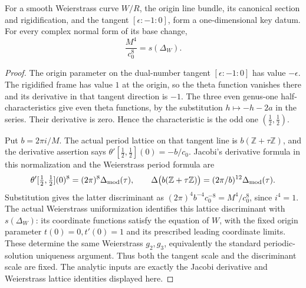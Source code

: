 \begin{srlemma}
\label{lem:ftb-key-elliptic-discriminant}
For a smooth Weierstrass curve \(W/R\), the origin line bundle,
its canonical section and rigidification, and the tangent
\([\epsilon:-1:0]\), form a one-dimensional key datum.
For every complex normal form of its base change,
\[
                         \frac{M^4}{c_0^8}=s(\Delta_W).
 \tag{A1}\label{eq:ftb-key-elliptic}
\]
\end{srlemma}
\begin{proof}
The origin parameter on the dual-number tangent
\([\epsilon:-1:0]\) has value \(-\epsilon\).
The rigidified frame has value \(1\) at the origin, so the theta
function vanishes there and its derivative in that tangent
direction is \(-1\).
The three even genus-one half-characteristics give even theta
functions, by the substitution \(h\mapsto-h-2a\) in the series.
Their derivative is zero.  Hence the characteristic is the odd
one \((\tfrac12,\tfrac12)\).

Put \(b=2\pi i/M\).  The actual period lattice on that tangent line
is \(b(\mathbb Z+\tau\mathbb Z)\), and the derivative assertion says
\(\theta'[\tfrac12,\tfrac12](0)=-b/c_0\).
Jacobi's derivative formula in this normalization and the
Weierstrass period formula are
\[
 \theta'[\tfrac12,\tfrac12](0)^8=(2\pi)^8\Delta_{\rm mod}(\tau),
 \qquad
 \Delta\bigl(b(\mathbb Z+\tau\mathbb Z)\bigr)
                       =(2\pi/b)^{12}\Delta_{\rm mod}(\tau).
\]
Substitution gives the latter discriminant as
\((2\pi)^4b^{-4}c_0^{-8}=M^4/c_0^8\), since \(i^4=1\).
The actual Weierstrass uniformization identifies this lattice
discriminant with \(s(\Delta_W)\): its coordinate functions
satisfy the equation of \(W\), with the fixed origin parameter
\(t(0)=0,t'(0)=1\) and its prescribed leading coordinate limits.
These determine the same Weierstrass \(g_2,g_3\), equivalently
the standard periodic-solution uniqueness argument.
Thus both the tangent scale and the discriminant scale are fixed.
The analytic inputs are exactly the Jacobi derivative and
Weierstrass lattice identities displayed here.
\end{proof}

